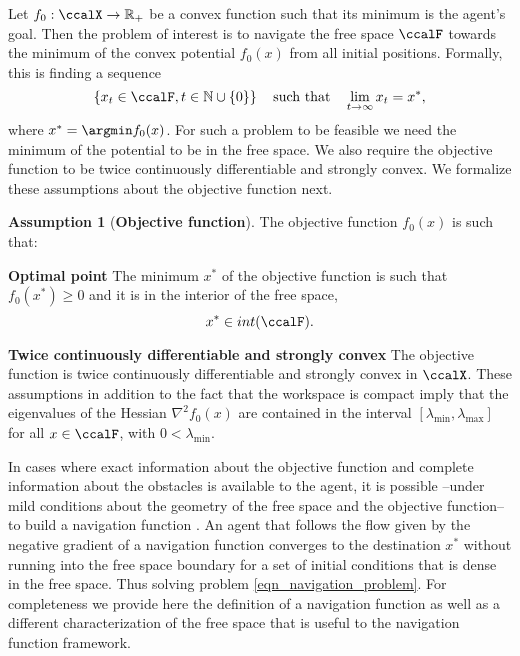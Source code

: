 \documentclass[article]{IEEEtran}
\theoremstyle{definition}
\newtheorem{assumption}{Assumption}
\begin{document}
%
%
Let $f_0: \ccalX\to \mathbb{R}_+$ be a convex function such that its minimum is the agent's goal. Then the problem of interest is  to navigate the free space $\ccalF$ towards the minimum of the convex potential $f_0(x)$ from all initial positions. Formally, this is finding a sequence 
%
\begin{equation}\label{eqn_navigation_problem}
\left\{x_t \in \ccalF, t \in \mathbb{N}\cup \left\{0\right\}\right\} \quad \mbox{such that}  \quad \lim_{t\to\infty} x_t =x^*,
\end{equation}
%
where $x^* = \argmin f_0(x)$. For such a problem to be feasible we need the minimum of the potential to be in the free space. We also require the objective function to be twice continuously differentiable and strongly convex. We formalize these assumptions about the objective function next.
%
\begin{assumption}[\bf Objective function]\label{assum_objective_function}
The objective function $f_0(x)$ is such that:
\begin{mylist}
\item[\bf Optimal point]
The minimum $x^*$ of the objective function is such that $f_0(x^*)\geq 0$ and it is in the interior of the free space,
%
\begin{equation}
x^* \in int(\ccalF).
\end{equation} 
%
\item[\bf Twice continuously differentiable and strongly convex] 
The objective function is twice continuously differentiable and strongly convex in $\ccalX$. These assumptions in addition to the fact that the workspace is compact imply that the eigenvalues of the Hessian $\nabla^2 f_0(x)$ are contained in the interval $[\lambda_{\min}, \lambda_{\max}]$ for all $x\in\ccalF$, with $0 < \lambda_{\min}$.
\end{mylist}
\end{assumption}
%
In cases where exact information about the objective function and complete information about the obstacles is available to the agent, it is possible --under mild conditions about the geometry of the free space and the objective function-- to build a navigation function \cite{PaternainEtal15}. An agent that follows the flow given by the negative gradient of a navigation function converges to the destination $x^*$ without running into the free space boundary for a set of initial conditions that is dense in the free space\cite{koditschek1988strict}. Thus solving problem \eqref{eqn_navigation_problem}. For completeness we provide here the definition of a navigation function as well as a different characterization of the free space that is useful to the navigation function framework.
\end{document}
